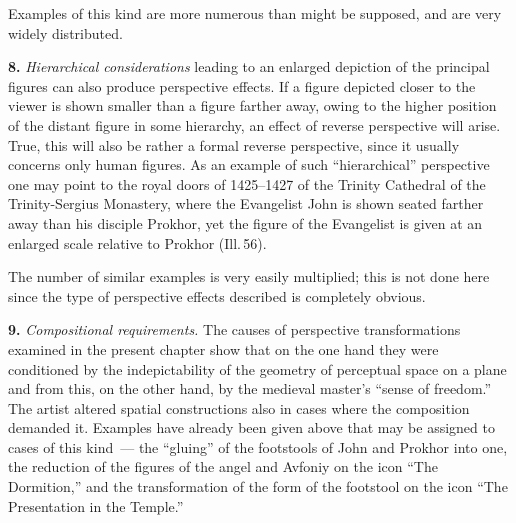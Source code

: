 
Examples of this kind are more numerous than might be supposed, and are very widely
distributed.

\medskip
\noindent\textbf{8.}\quad
\emph{Hierarchical considerations} leading to an enlarged depiction of the principal
figures can also produce perspective effects.  If a figure depicted closer to the
viewer is shown smaller than a figure farther away, owing to the higher position of
the distant figure in some hierarchy, an effect of reverse perspective will arise.
True, this will also be rather a formal reverse perspective, since it usually concerns
only human figures.  As an example of such ``hierarchical'' perspective one may point
to the royal doors of 1425--1427 of the Trinity Cathedral of the Trinity-Sergius
Monastery, where the Evangelist John is shown seated farther away than his disciple
Prokhor, yet the figure of the Evangelist is given at an enlarged scale relative to
Prokhor (Ill.\,56).



The number of similar examples is very easily multiplied; this is not done here since
the type of perspective effects described is completely obvious.

\medskip
\noindent\textbf{9.}\quad
\emph{Compositional requirements.}  The causes of perspective transformations examined
in the present chapter show that on the one hand they were conditioned by the
indepictability of the geometry of perceptual space on a plane and from this, on the
other hand, by the medieval master's ``sense of freedom.''  The artist altered spatial
constructions also in cases where the composition demanded it.  Examples have already
been given above that may be assigned to cases of this kind~--- the ``gluing'' of the
footstools of John and Prokhor into one, the reduction of the figures of the angel
and Avfoniy on the icon ``The Dormition,'' and the transformation of the form of the
footstool on the icon ``The Presentation in the Temple.''

